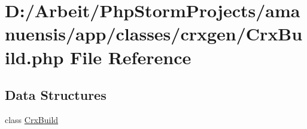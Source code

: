 \hypertarget{_crx_build_8php}{}\section{D\+:/\+Arbeit/\+Php\+Storm\+Projects/amanuensis/app/classes/crxgen/\+Crx\+Build.php File Reference}
\label{_crx_build_8php}
\subsection*{Data Structures}
\begin{DoxyCompactItemize}
\item 
class \hyperlink{class_crx_build}{Crx\+Build}
\end{DoxyCompactItemize}
